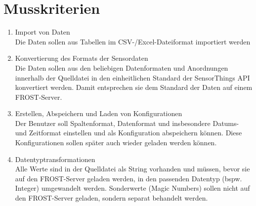 \documentclass[12 pt]{article}
\begin{document}
	\section{Musskriterien}
	\begin{enumerate}
	\item Import von Daten \\
	Die Daten sollen aus Tabellen im CSV-/Excel-Dateiformat importiert werden
	\item Konvertierung des Formats der Sensordaten \\
	Die Daten sollen aus den beliebigen Datenformaten und Anordnungen innerhalb der Quelldatei in den einheitlichen Standard der SensorThings API konvertiert werden.
	Damit entsprechen sie dem Standard der Daten auf einem FROST-Server.
	\item Erstellen, Abspeichern und Laden von Konfigurationen \\
	Der Benutzer soll Spaltenformat, Datenformat und insbesondere Datums- und Zeitformat einstellen und als Konfiguration abspeichern können.
	Diese Konfigurationen sollen später auch wieder geladen werden können.
	\item Datentyptransformationen \\
	Alle Werte sind in der Quelldatei als String vorhanden und müssen, bevor sie auf den FROST-Server geladen werden, in den passenden Datentyp (bspw. Integer) umgewandelt werden.
	Sonderwerte (Magic Numbers) sollen nicht auf den FROST-Server geladen, sondern separat behandelt werden.
\end{enumerate}
\end{document}
